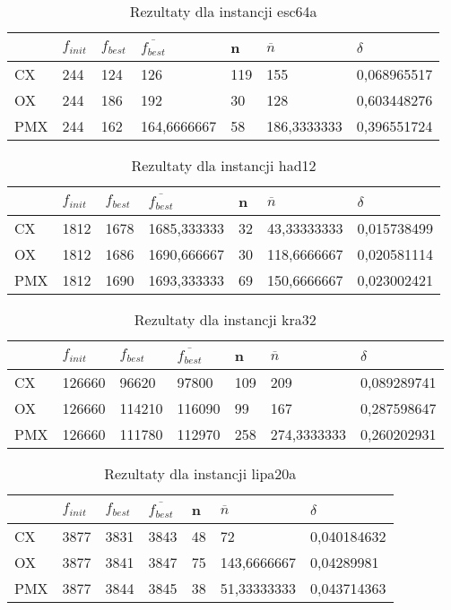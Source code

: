 \begin{table}[H]
\label{T2_esc64a}
\begin{tabular}{l l l l l l l}
\hline
 & $f_{init}$ & $f_{best}$ & $\overline{f_{best}}$ & n & $\overline{n}$ & $\delta$ \\
\hline
CX & 244 & 124 & 126 & 119 & 155 & 0,068965517\\
OX & 244 & 186 & 192 & 30 & 128 & 0,603448276\\
PMX & 244 & 162 & 164,6666667 & 58 & 186,3333333 & 0,396551724\\
\hline
\end{tabular}
\caption{Rezultaty dla instancji esc64a}
\end{table}

\begin{table}[H]
\label{T2_had12}
\begin{tabular}{l l l l l l l}
\hline
 & $f_{init}$ & $f_{best}$ & $\overline{f_{best}}$ & n & $\overline{n}$ & $\delta$ \\
\hline
CX & 1812 & 1678 & 1685,333333 & 32 & 43,33333333 & 0,015738499\\
OX & 1812 & 1686 & 1690,666667 & 30 & 118,6666667 & 0,020581114\\
PMX	& 1812 & 1690 & 1693,333333 & 69 & 150,6666667 & 0,023002421\\
\hline
\end{tabular}
\caption{Rezultaty dla instancji had12}
\end{table}

\begin{table}[H]
\label{T2_kra32}
\begin{tabular}{l l l l l l l}
\hline
 & $f_{init}$ & $f_{best}$ & $\overline{f_{best}}$ & n & $\overline{n}$ & $\delta$ \\
\hline
CX & 126660 & 96620 & 97800 & 109 & 209 & 0,089289741\\
OX & 126660 & 114210 & 116090 & 99 & 167 & 0,287598647\\
PMX & 126660 & 111780 & 112970 & 258 & 274,3333333 & 0,260202931\\
\hline
\end{tabular}
\caption{Rezultaty dla instancji kra32}
\end{table}

\begin{table}[H]
\label{T2_lipa20a}
\begin{tabular}{l l l l l l l}
\hline
 & $f_{init}$ & $f_{best}$ & $\overline{f_{best}}$ & n & $\overline{n}$ & $\delta$ \\
\hline
CX & 3877 & 3831 & 3843 & 48 & 72 & 0,040184632\\
OX & 3877 & 3841 & 3847 & 75 & 143,6666667 & 0,04289981\\
PMX & 3877 & 3844 & 3845 & 38 & 51,33333333 & 0,043714363\\
\hline
\end{tabular}
\caption{Rezultaty dla instancji lipa20a}
\end{table}

